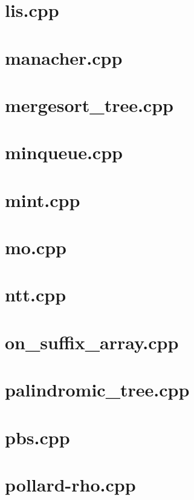 \documentclass[a4paper,12pt]{article}
\begin{document}
\section{lis.cpp}


\section{manacher.cpp}


\section{mergesort_tree.cpp}


\section{minqueue.cpp}


\section{mint.cpp}


\section{mo.cpp}


\section{ntt.cpp}


\section{on_suffix_array.cpp}


\section{palindromic_tree.cpp}


\section{pbs.cpp}


\section{pollard-rho.cpp}

\end{document}
